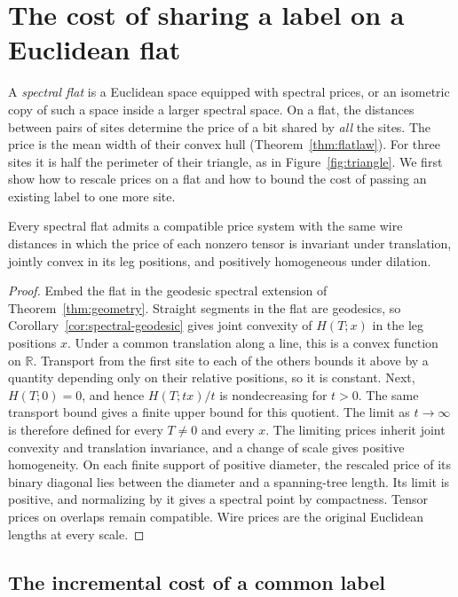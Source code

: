 \section{The cost of sharing a label on a Euclidean flat}
\label{sec:flatprice}
A \emph{spectral flat} is a Euclidean space equipped with spectral
prices, or an isometric copy of such a space inside a larger spectral
space. On a flat, the distances between pairs of sites determine the
price of a bit shared by \emph{all} the sites. The price is the mean
width of their convex hull (Theorem~\ref{thm:flatlaw}). For three sites
it is half the perimeter of their triangle, as in Figure~\ref{fig:triangle}.
We first show how to rescale prices on a flat and how to bound the cost
of passing an existing label to one more site.

\begin{lemma}\label{lem:homogenization}
Every spectral flat admits a compatible price system with the same
wire distances in which the price of each nonzero tensor is invariant
under translation, jointly convex in its leg positions, and positively
homogeneous under dilation.
\end{lemma}
\begin{proof}
Embed the flat in the geodesic spectral extension of
Theorem~\ref{thm:geometry}. Straight segments in the flat are geodesics,
so Corollary~\ref{cor:spectral-geodesic} gives joint convexity of
$H(T;x)$ in the leg positions $x$. Under a common translation along a
line, this is a convex function on $\mathbb R$. Transport from the first
site to each of the others bounds it above by a quantity depending only
on their relative positions, so it is constant. Next, $H(T;0)=0$,
and hence $H(T;tx)/t$ is nondecreasing for $t>0$. The same transport
bound gives a finite upper bound for this quotient. The limit as
$t\to\infty$ is therefore defined for every $T\ne0$ and every $x$.
The limiting prices inherit joint convexity and translation invariance,
and a change of scale gives positive homogeneity.
On each finite support of positive diameter, the rescaled price of its
binary diagonal lies between the diameter and a spanning-tree length.
Its limit is positive, and normalizing by it gives a spectral point
by compactness. Tensor prices on overlaps remain compatible. Wire
prices are the original Euclidean lengths at every scale.
\end{proof}

\subsection{The incremental cost of a common label}

